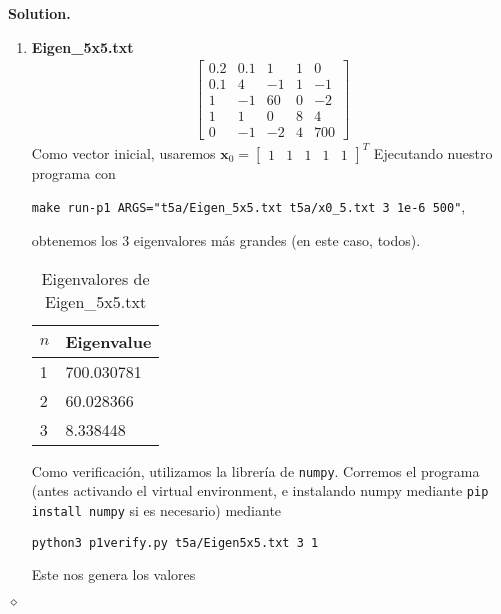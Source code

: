 \documentclass{article}
\theoremstyle{problemstyle}
\newenvironment{solution}{%
  \begin{mdframed}[linewidth=0.8pt,linecolor=Gray,backgroundcolor=Gray!5,roundcorner=5pt]%
  \noindent\textbf{Solution.}%
}{%
\hfill $ \diamond $ 
  \end{mdframed}%
}
\begin{document}
\begin{solution}
\begin{enumerate}
        \item \textbf{Eigen\_5x5.txt}
		      \begin{align*}
			      \begin{bmatrix}
				      0.2 & 0.1 & 1  & 1 & 0   \\
				      0.1 & 4   & -1 & 1 & -1  \\
				      1   & -1  & 60 & 0 & -2  \\
				      1   & 1   & 0  & 8 & 4   \\
				      0   & -1  & -2 & 4 & 700
			      \end{bmatrix}
		      \end{align*}
		      Como vector inicial, usaremos $ \mathbf{x}_0 = \begin{bmatrix}
				      1 & 1 & 1 & 1 & 1
			      \end{bmatrix}^{T} $
		      Ejecutando nuestro programa con
		      \begin{center}
			      \texttt{make run-p1
				      ARGS="t5a/Eigen\_5x5.txt t5a/x0\_5.txt 3 1e-6 500"},
		      \end{center}
		      obtenemos los 3 eigenvalores m\'as grandes (en este caso, todos).
		      \begin{table}[H]
			      \begin{center}
				      \begin{tabular}{|l|l|}
					      \hline
					      $ n $ & Eigenvalue \\
					      \hline
					      1     & 700.030781 \\
					      \hline
					      2     & 60.028366  \\
					      \hline
					      3     & 8.338448   \\
					      \hline
				      \end{tabular}
			      \end{center}
			      \caption{Eigenvalores de Eigen\_5x5.txt}\label{tab:5x5}
		      \end{table}
		      Como verificaci\'on, utilizamos la librer\'ia de \texttt{numpy}. Corremos el programa (antes activando el virtual environment, e instalando numpy mediante \texttt{pip install numpy} si es necesario) mediante
		      \begin{center}
			      \texttt{python3 p1\textunderscore verify.py t5a/Eigen\textunderscore5x5.txt 3 1}
		      \end{center}
		      Este nos genera los valores
		      \begin{table}[H]
			      \begin{center}

\end{center}
\end{table}
\end{enumerate}
\end{solution}
\end{document}
